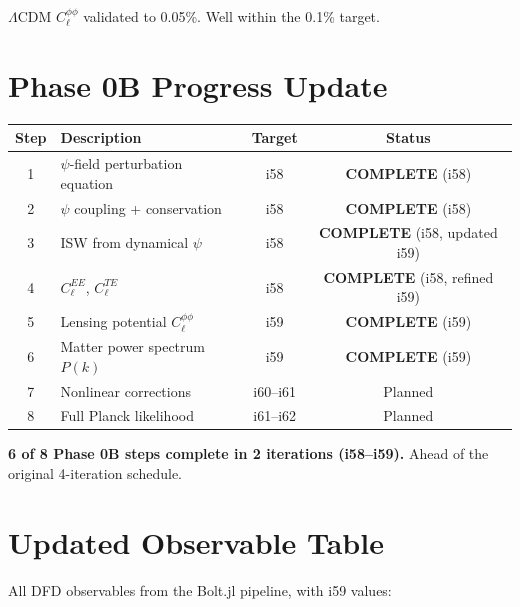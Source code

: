 \documentclass[11pt,a4paper]{article}
\begin{document}
$\Lambda$CDM $C_\ell^{\phi\phi}$ validated to 0.05\%. Well within the 0.1\% target.

\section{Phase 0B Progress Update}

\begin{center}
\begin{longtable}{clcc}
\toprule
\textbf{Step} & \textbf{Description} & \textbf{Target} & \textbf{Status} \\
\midrule
1 & $\psi$-field perturbation equation & i58 & \textbf{COMPLETE} (i58) \\
2 & $\psi$ coupling + conservation & i58 & \textbf{COMPLETE} (i58) \\
3 & ISW from dynamical $\psi$ & i58 & \textbf{COMPLETE} (i58, updated i59) \\
4 & $C_\ell^{EE}$, $C_\ell^{TE}$ & i58 & \textbf{COMPLETE} (i58, refined i59) \\
5 & Lensing potential $C_\ell^{\phi\phi}$ & i59 & \textbf{COMPLETE} (i59) \\
6 & Matter power spectrum $P(k)$ & i59 & \textbf{COMPLETE} (i59) \\
7 & Nonlinear corrections & i60--i61 & Planned \\
8 & Full Planck likelihood & i61--i62 & Planned \\
\bottomrule
\end{longtable}
\end{center}

\textbf{6 of 8 Phase 0B steps complete in 2 iterations (i58--i59).} Ahead of the original 4-iteration schedule.

\section{Updated Observable Table}

All DFD observables from the Bolt.jl pipeline, with i59 values:
\end{document}
